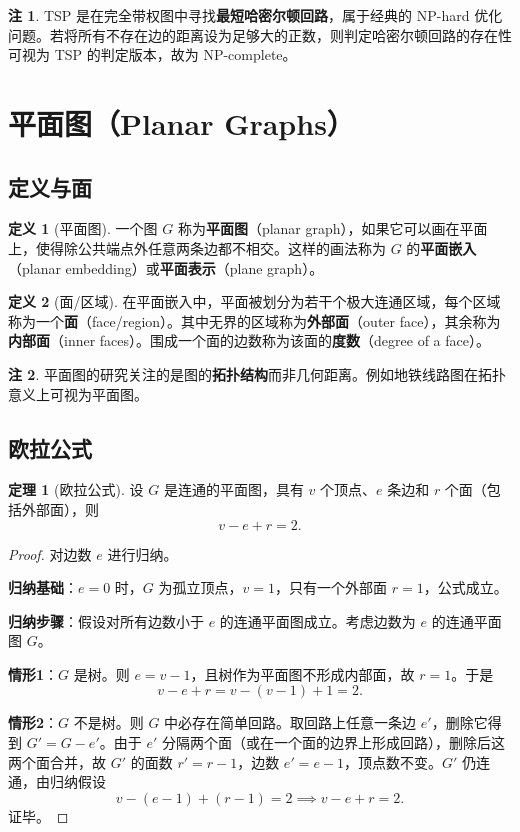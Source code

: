 \documentclass[UTF8,11pt,a4paper]{ctexbook}   %
\theoremstyle{definition}
\newtheorem{definition}{定义}[section]
\newtheorem{theorem}{定理}[section]
\newtheorem{remark}{注}[section]
\begin{document}
\begin{remark}
TSP 是在完全带权图中寻找\textbf{最短哈密尔顿回路}，属于经典的 NP-hard 优化问题。若将所有不存在边的距离设为足够大的正数，则判定哈密尔顿回路的存在性可视为 TSP 的判定版本，故为 NP-complete。
\end{remark}

\section{平面图（Planar Graphs）}

\subsection{定义与面}

\begin{definition}[平面图]
一个图 $G$ 称为\textbf{平面图}（planar graph），如果它可以画在平面上，使得除公共端点外任意两条边都不相交。这样的画法称为 $G$ 的\textbf{平面嵌入}（planar embedding）或\textbf{平面表示}（plane graph）。
\end{definition}

\begin{definition}[面/区域]
在平面嵌入中，平面被划分为若干个极大连通区域，每个区域称为一个\textbf{面}（face/region）。其中无界的区域称为\textbf{外部面}（outer face），其余称为\textbf{内部面}（inner faces）。围成一个面的边数称为该面的\textbf{度数}（degree of a face）。
\end{definition}

\begin{remark}
平面图的研究关注的是图的\textbf{拓扑结构}而非几何距离。例如地铁线路图在拓扑意义上可视为平面图。
\end{remark}

\subsection{欧拉公式}

\begin{theorem}[欧拉公式]
设 $G$ 是连通的平面图，具有 $v$ 个顶点、$e$ 条边和 $r$ 个面（包括外部面），则
\[
v - e + r = 2.
\]
\end{theorem}

\begin{proof}
对边数 $e$ 进行归纳。

\textbf{归纳基础}：$e=0$ 时，$G$ 为孤立顶点，$v=1$，只有一个外部面 $r=1$，公式成立。

\textbf{归纳步骤}：假设对所有边数小于 $e$ 的连通平面图成立。考虑边数为 $e$ 的连通平面图 $G$。

\textbf{情形1}：$G$ 是树。则 $e=v-1$，且树作为平面图不形成内部面，故 $r=1$。于是
\[
v-e+r = v-(v-1)+1 = 2.
\]

\textbf{情形2}：$G$ 不是树。则 $G$ 中必存在简单回路。取回路上任意一条边 $e'$，删除它得到 $G'=G-e'$。由于 $e'$ 分隔两个面（或在一个面的边界上形成回路），删除后这两个面合并，故 $G'$ 的面数 $r'=r-1$，边数 $e'=e-1$，顶点数不变。$G'$ 仍连通，由归纳假设
\[
v-(e-1)+(r-1)=2 \implies v-e+r=2.
\]
证毕。
\end{proof}
\end{document}
